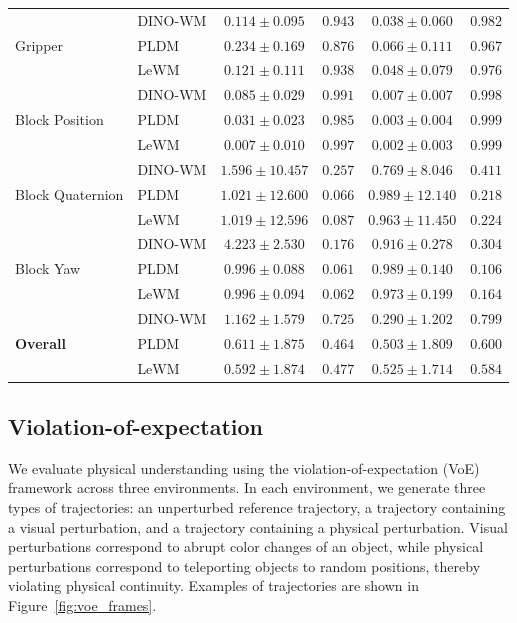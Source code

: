 \begin{table}[h]
{\begin{tabular}{l l c c c c}
\midrule
\multirow{3}{*}{Gripper}
  & DINO-WM & $0.114 \pm 0.095$ & $0.943$ & $0.038 \pm 0.060$ & $0.982$\\
  & PLDM    & $0.234 \pm 0.169$ & $0.876$ & $0.066 \pm 0.111$ & $0.967$\\
  & LeWM    & $0.121 \pm 0.111$ & $0.938$ & $0.048 \pm 0.079$ & $0.976$\\
\midrule
\multirow{3}{*}{Block Position}
  & DINO-WM & $0.085 \pm 0.029$ & $0.991$ & $0.007 \pm 0.007$ & $0.998$\\
  & PLDM    & $0.031 \pm 0.023$ & $0.985$ & $0.003 \pm 0.004$ & $0.999$\\
  & LeWM    & $0.007 \pm 0.010$ & $0.997$ & $0.002 \pm 0.003$ & $0.999$\\
\midrule
\multirow{3}{*}{Block Quaternion}
  & DINO-WM & $1.596 \pm 10.457$ & $0.257$ & $0.769 \pm 8.046$ & $0.411$\\
  & PLDM    & $1.021 \pm 12.600$ & $0.066$ & $0.989 \pm 12.140$ & $0.218$\\
  & LeWM    & $1.019 \pm 12.596$ & $0.087$ & $0.963 \pm 11.450$ & $0.224$\\
\midrule
\multirow{3}{*}{Block Yaw}
  & DINO-WM & $4.223 \pm 2.530$ & $0.176$ & $0.916 \pm 0.278$ & $0.304$\\
  & PLDM    & $0.996 \pm 0.088$ & $0.061$ & $0.989 \pm 0.140$ & $0.106$\\
  & LeWM    & $0.996 \pm 0.094$ & $0.062$ & $0.973 \pm 0.199$ & $0.164$\\
\midrule
\multirow{3}{*}{\textbf{Overall}}
  & DINO-WM & $1.162 \pm 1.579$ & $0.725$ & $0.290 \pm 1.202$ & $0.799$\\
  & PLDM    & $0.611 \pm 1.875$ & $0.464$ & $0.503 \pm 1.809$ & $0.600$\\
  & LeWM    & $0.592 \pm 1.874$ & $0.477$ & $0.525 \pm 1.714$ & $0.584$\\
\bottomrule
\end{tabular}%
}
\label{tab:probe-cube}
\end{table}

\subsection{Violation-of-expectation}\label{appendix:voe}

We evaluate physical understanding using the violation-of-expectation (VoE) framework across three environments. In each environment, we generate three types of trajectories: an unperturbed reference trajectory, a trajectory containing a visual perturbation, and a trajectory containing a physical perturbation. Visual perturbations correspond to abrupt color changes of an object, while physical perturbations correspond to teleporting objects to random positions, thereby violating physical continuity. Examples of trajectories are shown in Figure~\ref{fig:voe_frames}.

